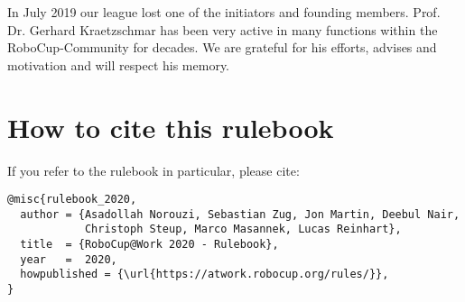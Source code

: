 \begin{titlepage}
In July 2019 our league lost one of the initiators and founding members. Prof. Dr. Gerhard
Kraetzschmar has been very active in many functions within the RoboCup-Community
for decades. We are grateful for his efforts, advises and motivation and will respect his memory.

\section*{How to cite this rulebook}

If you refer to the rulebook in particular, please cite:


\begin{verbatim}
@misc{rulebook_2020,
  author = {Asadollah Norouzi, Sebastian Zug, Jon Martin, Deebul Nair,
            Christoph Steup, Marco Masannek, Lucas Reinhart},
  title  = {RoboCup@Work 2020 - Rulebook},
  year   =  2020,
  howpublished = {\url{https://atwork.robocup.org/rules/}},
}
\end{verbatim}

\end{titlepage}
